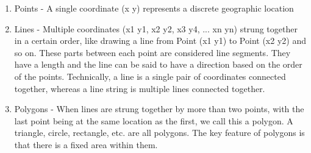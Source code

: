 \begin{enumerate}
\item Points - A single coordinate (x y) represents a discrete geographic
location
\item Lines - Multiple coordinates (x1 y1, x2 y2, x3 y4, ... xn yn) strung
together in a certain order, like drawing a line from Point (x1 y1) to
Point (x2 y2) and so on. These parts between each point are considered line
segments. They have a length and the line can be said to have a direction
based on the order of the points. Technically, a line is a single pair of
coordinates connected together, whereas a line string is multiple lines
connected together.  
\item Polygons - When lines are strung together by more
than two points, with the last point being at the same location as the
first, we call this a polygon. A triangle, circle, rectangle, etc. are all
polygons. The key feature of polygons is that there is a fixed area within them.  
\end{enumerate}

